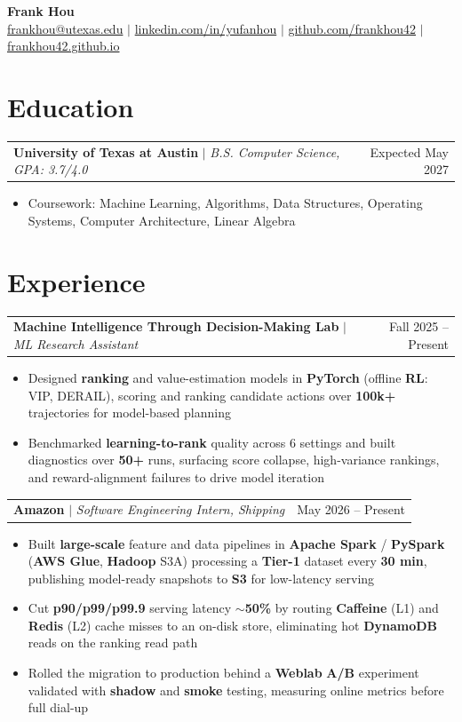 \documentclass[letterpaper,10pt]{article}
\makeatletter
\newcommand{\resumeWorkHeading}[2]{%
  \vspace{2pt}\noindent
  \begin{tabular*}{\textwidth}{@{}l@{\extracolsep{\fill}}r@{}}
    #1 & #2 \\
  \end{tabular*}%
  \vspace{-2pt}
}
\newcommand{\resumeItemListStart}{\begin{itemize}}
\newcommand{\resumeItemListEnd}{\end{itemize}\vspace{3pt}}
\newcommand{\resumeItem}[1]{\item #1}
\makeatother
\begin{document}
\begin{center}
  {\huge \textbf{Frank Hou}} \\[2pt]
  \small
  \href{mailto:frankhou@utexas.edu}{frankhou@utexas.edu} $|$
  \href{https://linkedin.com/in/yufanhou}{linkedin.com/in/yufanhou} $|$
  \href{https://github.com/frankhou42}{github.com/frankhou42} $|$
  \href{https://frankhou42.github.io/}{frankhou42.github.io}
\end{center}
\vspace{-4pt}

\section{Education}
\resumeWorkHeading
{\textbf{University of Texas at Austin} $|$ \emph{B.S. Computer Science, GPA: 3.7/4.0}}{Expected May 2027}
\resumeItemListStart
\resumeItem{Coursework: Machine Learning, Algorithms, Data Structures, Operating Systems, Computer Architecture, Linear Algebra}
\resumeItemListEnd

\section{Experience}
\resumeWorkHeading
{\textbf{Machine Intelligence Through Decision-Making Lab} $|$ \emph{ML Research Assistant}}{Fall 2025 -- Present}
\resumeItemListStart
\resumeItem{Designed \textbf{ranking} and value-estimation models in \textbf{PyTorch} (offline \textbf{RL}: VIP, DERAIL), scoring and ranking candidate actions over \textbf{100k+} trajectories for model-based planning}
\resumeItem{Benchmarked \textbf{learning-to-rank} quality across 6 settings and built diagnostics over \textbf{50+} runs, surfacing score collapse, high-variance rankings, and reward-alignment failures to drive model iteration}
\resumeItemListEnd

\resumeWorkHeading
{\textbf{Amazon} $|$ \emph{Software Engineering Intern, Shipping}}{May 2026 -- Present}
\resumeItemListStart
\resumeItem{Built \textbf{large-scale} feature and data pipelines in \textbf{Apache Spark} / \textbf{PySpark} (\textbf{AWS Glue}, \textbf{Hadoop} S3A) processing a \textbf{Tier-1} dataset every \textbf{30 min}, publishing model-ready snapshots to \textbf{S3} for low-latency serving}
\resumeItem{Cut \textbf{p90/p99/p99.9} serving latency \textbf{$\sim$50\%} by routing \textbf{Caffeine} (L1) and \textbf{Redis} (L2) cache misses to an on-disk store, eliminating hot \textbf{DynamoDB} reads on the ranking read path}
\resumeItem{Rolled the migration to production behind a \textbf{Weblab} \textbf{A/B} experiment validated with \textbf{shadow} and \textbf{smoke} testing, measuring online metrics before full dial-up}
\resumeItemListEnd
\end{document}
